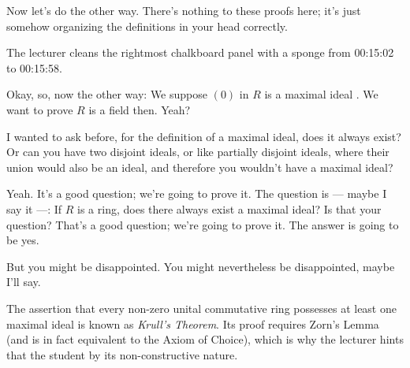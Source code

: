 \begin{speech}[00:14:48 - 00:15:02]
Now let's do the other way. There's nothing to these proofs here; it's just somehow organizing the definitions in your head correctly. 
\end{speech}

\begin{note}
The lecturer cleans the rightmost chalkboard panel with a sponge from 00:15:02 to 00:15:58.
\end{note}

\begin{speech}[00:15:58 - 00:16:17]
Okay, so, now the other way: We suppose $(0)$ in $R$ is a maximal ideal . We want to prove $R$ is a field then. Yeah?
\end{speech}

\begin{student}
I wanted to ask before, for the definition of a maximal ideal, does it always exist? Or can you have two disjoint ideals, or like partially disjoint ideals, where their union would also be an ideal, and therefore you wouldn't have a maximal ideal?
\end{student}

\begin{speech}[00:16:30 - 00:16:51]
Yeah. It's a good question; we're going to prove it. The question is --- maybe I say it ---: If $R$ is a ring, does there always exist a maximal ideal? Is that your question? That's a good question; we're going to prove it. The answer is going to be yes.

But you might be disappointed. You might nevertheless be disappointed, maybe I'll say.
\end{speech}

\begin{aiNote}
The assertion that every non-zero unital commutative ring possesses at least one maximal ideal is known as \emph{Krull's Theorem}. Its proof requires Zorn's Lemma (and is in fact equivalent to the Axiom of Choice), which is why the lecturer hints that the student  by its non-constructive nature.
\end{aiNote}

